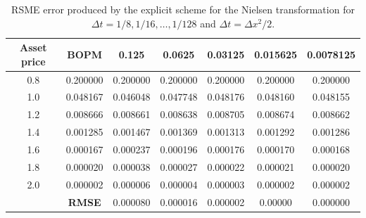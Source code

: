 \begin{table}[H]
    \centering
    \begin{tabular}{@{}ccccccc@{}}
    \toprule
    \textbf{Asset price} & \textbf{BOPM} & 0.125    & 0.0625   & 0.03125  & 0.015625 & 0.0078125 \\ \midrule
    0.8                  & 0.200000      & 0.200000 & 0.200000 & 0.200000 & 0.200000 & 0.200000  \\
    1.0                  & 0.048167      & 0.046048 & 0.047748 & 0.048176 & 0.048160 & 0.048155  \\
    1.2                  & 0.008666      & 0.008661 & 0.008638 & 0.008705 & 0.008674 & 0.008662  \\
    1.4                  & 0.001285      & 0.001467 & 0.001369 & 0.001313 & 0.001292 & 0.001286  \\
    1.6                  & 0.000167      & 0.000237 & 0.000196 & 0.000176 & 0.000170 & 0.000168  \\
    1.8                  & 0.000020      & 0.000038 & 0.000027 & 0.000022 & 0.000021 & 0.000020  \\
    2.0                  & 0.000002      & 0.000006 & 0.000004 & 0.000003 & 0.000002 & 0.000002  \\
                         & \textbf{RMSE} & 0.000080 & 0.000016 & 0.000002 & 0.00000  & 0.000000  \\ \bottomrule
    \end{tabular}
    \caption{\label{tab:rsme_explicit_nielsen_transformation}RSME error produced by the explicit scheme for the Nielsen transformation for $\Delta{t}=1/8,1/16,\dots,1/128$ and $\Delta{t}=\Delta{x}^2/2$.}
\end{table}


